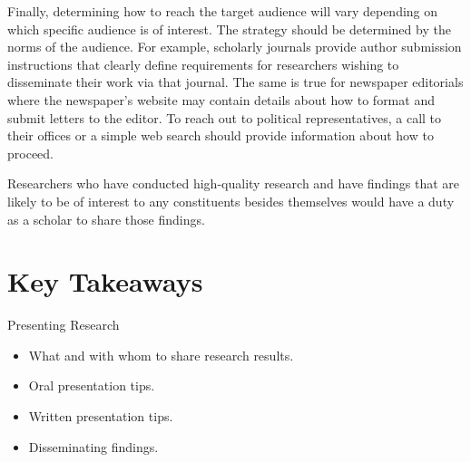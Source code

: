 Finally, determining how to reach the target audience will vary depending on which specific audience is of interest. The strategy should be determined by the norms of the audience. For example, scholarly journals provide author submission instructions that clearly define requirements for researchers wishing to disseminate their work via that journal. The same is true for newspaper editorials where the newspaper's website may contain details about how to format and submit letters to the editor. To reach out to political representatives, a call to their offices or a simple web search should provide information about how to proceed.

Researchers who have conducted high-quality research and have findings that are likely to be of interest to any constituents besides themselves would have a duty as a scholar to share those findings. 

\section{Key Takeaways}\label{ch15:summary}

\begin{center}
	\begin{tkawybox}{Presenting Research}
		\begin{itemize}
			\setlength{\itemsep}{0pt}
			\setlength{\parskip}{0pt}
			\setlength{\parsep}{0pt}
			
			\item What and with whom to share research results.
			\item Oral presentation tips.
			\item Written presentation tips.
			\item Disseminating findings.

		\end{itemize}
	\end{tkawybox}
\end{center}
